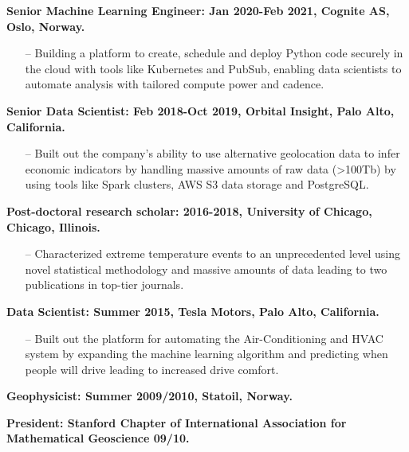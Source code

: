 \documentclass[letterpaper, 12pt]{article}
\renewenvironment{itemize}{
  \begin{list}{}{
    \setlength{\leftmargin}{1.5em}
  }
}{
  \end{list}
}
\begin{document}
\begin{itemize}
  \item \textbf{Senior Machine Learning Engineer: Jan 2020-Feb 2021, Cognite AS, Oslo, Norway. }
  \begin{enumerate}
       \item[--] Building a platform to create, schedule and deploy Python code securely in the cloud with tools like Kubernetes and PubSub, enabling data scientists to automate analysis with tailored compute power and cadence.
   \end{enumerate}
  \item \textbf{Senior Data Scientist: Feb 2018-Oct 2019, Orbital Insight, Palo Alto, California. }
  \begin{enumerate}
       \item[--] Built out the company's ability to use alternative geolocation data to infer economic indicators by handling massive amounts of raw data (>100Tb) by using tools like Spark clusters, AWS S3 data storage and PostgreSQL.
   \end{enumerate}
  \newpage
  \item \textbf{Post-doctoral research scholar: 2016-2018, University of Chicago, Chicago, Illinois.}
  \begin{enumerate}
       \item[--] Characterized extreme temperature events to an unprecedented level using novel statistical methodology and massive amounts of data leading to two publications in top-tier journals. 
   \end{enumerate}
  \item \textbf{Data Scientist: Summer 2015, Tesla Motors, Palo Alto, California.}
  \begin{enumerate}
       \item[--] Built out the platform for automating the Air-Conditioning and HVAC system by expanding the machine learning algorithm and predicting when people will drive leading to increased drive comfort.
   \end{enumerate}
  \item \textbf{Geophysicist: Summer 2009/2010, Statoil, Norway.}
  \item \textbf{President: Stanford Chapter of International Association
          for Mathematical Geoscience 09/10.}
\end{itemize}
\end{document}
